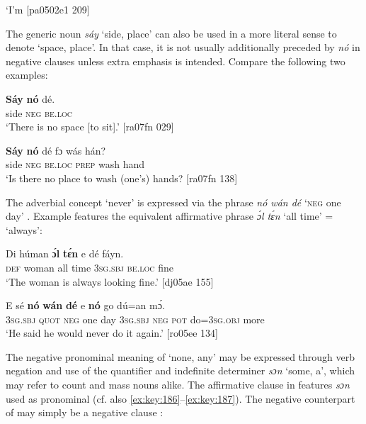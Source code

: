 \glt ‘I’m [pa0502e1 209]
\z

The generic noun \textit{sáy} ‘side, place’ can also be used in a more literal sense to denote ‘space, place’. In that case, it is not usually additionally preceded by \textit{nó} in negative clauses unless extra emphasis is intended. Compare the following two examples: 


\ea%
    \label{ex:key:567}
    \gll \textbf{Sáy}  \textbf{nó}  dé.\\
side  \textsc{neg}  \textsc{be.loc}\\

\glt ‘There is no space [to sit].’ [ra07fn 029]
\z


\ea%
    \label{ex:key:568}
    \gll \textbf{Sáy}  \textbf{nó}  dé    fɔ  wás    hán?\\
side  \textsc{neg}  \textsc{be.loc}  \textsc{prep}  wash  hand\\

\glt ‘Is there no place to wash (one’s) hands? [ra07fn 138]
\z

The adverbial concept ‘never’ is expressed via the phrase \textit{nó wán dé} ‘\textsc{neg} one day’ . Example  features the equivalent affirmative phrase \textit{ɔ́l tɛ́n} ‘all time’ = ‘always’: 


\ea%
    \label{ex:key:569}
    \gll Di  húman  \textbf{ɔ́l}  \textbf{tɛ́n}  e    dé    fáyn.\\
\textsc{def}  woman  all  time  \textsc{3sg.sbj}  \textsc{be.loc}  fine\\

\glt ‘The woman is always looking fine.’ [dj05ae 155]
\z


\ea%
    \label{ex:key:570}
    \gll E    sé    \textbf{nó}  \textbf{wán}  \textbf{dé}  e    \textbf{nó}  go  dú=an    mɔ́.\\
\textsc{3sg.sbj}  \textsc{quot}    \textsc{neg}  one  day  \textsc{3sg.sbj}  \textsc{neg}  \textsc{pot}  do=\textsc{3sg.obj}  more\\

\glt ‘He said he would never do it again.’ [ro05ee 134]
\z

The negative pronominal meaning of ‘none, any’ may be expressed through verb negation and use of the quantifier and indefinite determiner \textit{sɔn} ‘some, a’, which may refer to count and mass nouns alike. The affirmative clause in  features \textit{sɔn} used as pronominal (cf. also \ref{ex:key:186}–\ref{ex:key:187}). The negative counterpart of  may simply be a negative clause :


